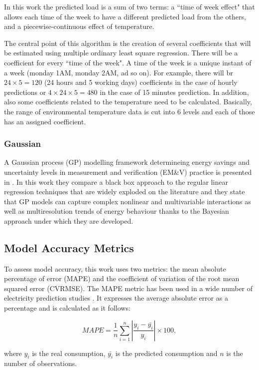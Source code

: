 \documentclass[10pt, conference, compsocconf]{IEEEtran}
\begin{document}
In this work the predicted load is a sum of two terms: a ``time of week effect" that allows each time of the week to have a different predicted load from the others, and a piecewise-continuous effect of temperature. 

The central point of this algorithm is the creation of several coefficients that will be estimated using multiple ordinary least square regression. There will be a coefficient for every ``time of the week". A time of the week is a unique instant of a week (monday 1AM, monday 2AM, ad so on). For example, there will br $24 \times 5 = 120$ (24 hours and 5 working days) coefficients in the case of hourly predictions or  $4\times 24 \times 5 = 480$ in the case of 15 minutes prediction. In addition, also some coefficients related to the temperature need to be calculated. Basically, the range of environmental temperature data is cut into 6 levels and each of those has an assigned coefficient.

\subsubsection{Gaussian}

A Gaussian process (GP) modelling framework determineing energy savings and uncertainty levels in measurement and verification (EM\&V) practice is presented in \cite{heo2012gaussian}.  In this work they compare a black box approach to the regular linear regression techniques that are widely exploded on the literature and they state that GP models can capture complex nonlinear and multivariable interactions as well as multiresolution trends of energy behaviour thanks to the Bayesian approach under which they are developed. 

\subsection{Model Accuracy Metrics}

To assess model accuracy, this work uses two metrics: the mean absolute percentage of error (MAPE) and the coefficient of variation of the root mean squared error (CVRMSE).
The MAPE metric has been used in a wide number of electricity prediction studies \cite{fan2014development, edwards2012predicting}
. It expresses the average absolute error as a percentage and is calculated as it follows:

\[
 MAPE = \frac{1}{n}\sum_{i=1}^{n} |\frac{y_i-\bar{y_i}}{y_i}|\times 100,
\]

where $y_i$ is the real consumption, $\bar{y_i}$ is the predicted consumption and $n$ is the number of observations.
\end{document}

